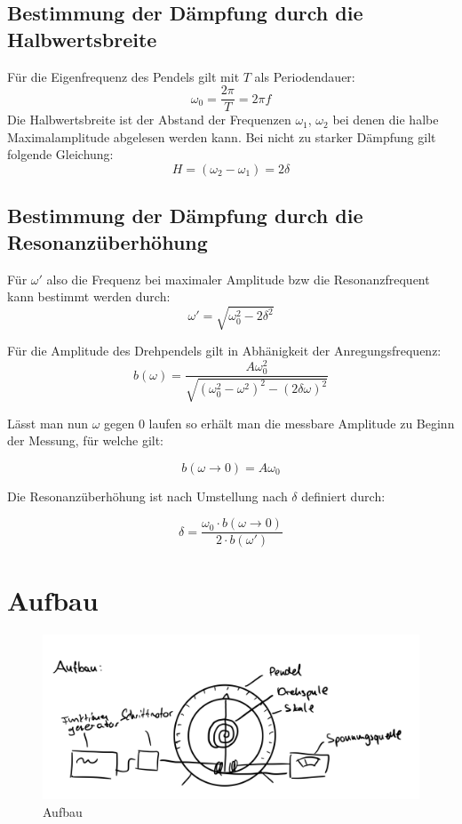 \subsection{Bestimmung der Dämpfung durch die Halbwertsbreite}

Für die Eigenfrequenz des Pendels gilt mit $T$ als Periodendauer:
\begin{equation}
    \omega_0 = \frac{2\pi}{T} = 2 \pi f
    \label{eq:eigen}
\end{equation}
Die Halbwertsbreite ist der Abstand der Frequenzen $\omega_1$, $\omega_2$ bei denen die halbe Maximalamplitude abgelesen werden kann.
Bei nicht zu starker Dämpfung gilt folgende Gleichung:
\begin{equation}
    H = (\omega_2-\omega_1) = 2\delta
    \label{eq:halb}
\end{equation}

\subsection{Bestimmung der Dämpfung durch die Resonanzüberhöhung}
Für $\omega'$ also die Frequenz bei maximaler Amplitude bzw die Resonanzfrequent kann bestimmt werden durch:
\begin{equation}
    \omega' = \sqrt{\omega_0^2 - 2\delta^2}
\end{equation}

Für die Amplitude des Drehpendels gilt in Abhänigkeit der Anregungsfrequenz:
\begin{equation}
    b(\omega) = \frac{A\omega_0^2}{\sqrt{(\omega_0^2-\omega^2)^2 - (2\delta\omega)^2}}
\end{equation}

Lässt man nun $\omega$ gegen 0 laufen so erhält man die messbare Amplitude zu Beginn der Messung, für welche gilt:

\begin{equation}
    b(\omega \rightarrow 0) = A \omega_0
\end{equation}

Die Resonanzüberhöhung ist nach Umstellung nach $\delta$ definiert durch:

\begin{equation}
    \delta = \frac{\omega_0 \cdot b(\omega \rightarrow 0)}{2 \cdot b(\omega')}
    \label{eq:deltafertig}
\end{equation}

\section{Aufbau}
\begin{figure}[h!]
    \centering
    \includegraphics[width = .5 \textwidth]{IMG_178CE5573475-1.jpeg}
    \caption{Aufbau}
\end{figure}